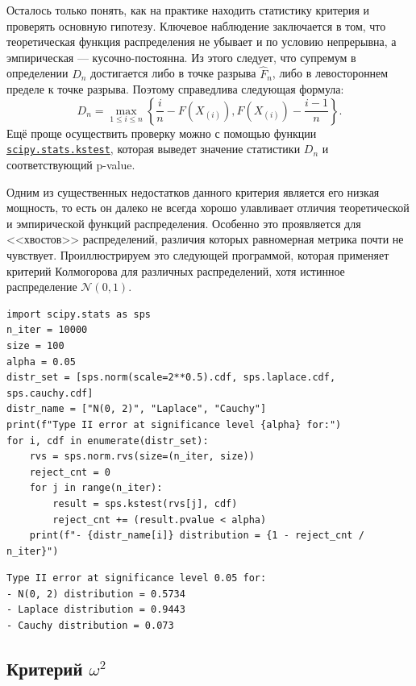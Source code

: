 Осталось только понять, как на практике находить статистику критерия и проверять основную гипотезу. Ключевое наблюдение заключается в том, что теоретическая функция распределения не убывает и по условию непрерывна, а эмпирическая --- кусочно-постоянна. Из этого следует, что супремум в определении $D_n$ достигается либо в точке разрыва $\widehat{F}_n$, либо в левостороннем пределе к точке разрыва. Поэтому справедлива следующая формула:
\[
D_n = \max_{1 \le i \le n} \left\{ \frac{i}{n} - F(X_{(i)}), F(X_{(i)}) - \frac{i - 1}{n} \right\}.
\]
Ещё проще осуществить проверку можно с помощью функции \href{https://docs.scipy.org/doc/scipy/reference/generated/scipy.stats.kstest.html}{\texttt{scipy.stats.kstest}}, которая выведет значение статистики $D_n$ и соответствующий p-value.

\begin{example}
    Одним из существенных недостатков данного критерия является его низкая мощность, то есть он далеко не всегда хорошо улавливает отличия теоретической и эмпирической функций распределения. Особенно это проявляется для <<хвостов>> распределений, различия которых равномерная метрика почти не чувствует. Проиллюстрируем это следующей программой, которая применяет критерий Колмогорова для различных распределений, хотя истинное распределение $\mathcal{N}(0, 1)$.
    \begin{verbatim}
import scipy.stats as sps
n_iter = 10000
size = 100
alpha = 0.05
distr_set = [sps.norm(scale=2**0.5).cdf, sps.laplace.cdf, sps.cauchy.cdf]
distr_name = ["N(0, 2)", "Laplace", "Cauchy"]
print(f"Type II error at significance level {alpha} for:")
for i, cdf in enumerate(distr_set):
    rvs = sps.norm.rvs(size=(n_iter, size))
    reject_cnt = 0
    for j in range(n_iter):
        result = sps.kstest(rvs[j], cdf)
        reject_cnt += (result.pvalue < alpha)
    print(f"- {distr_name[i]} distribution = {1 - reject_cnt / n_iter}")
    \end{verbatim}
\begin{lstlisting}
Type II error at significance level 0.05 for:
- N(0, 2) distribution = 0.5734
- Laplace distribution = 0.9443
- Cauchy distribution = 0.073
\end{lstlisting}
\end{example}

\subsection{Критерий $\omega^2$}\label{omega2_tests}

